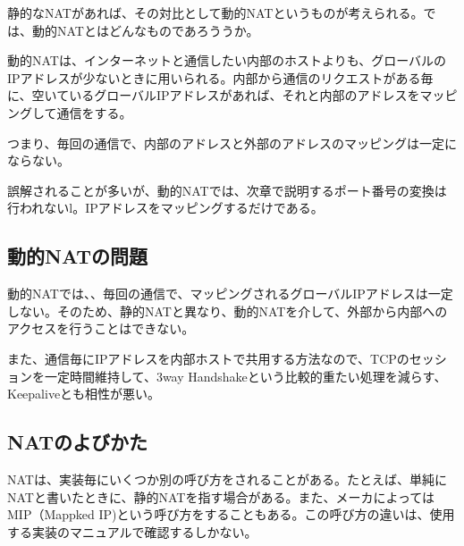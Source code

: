 静的なNATがあれば、その対比として動的NATというものが考えられる。では、動的NATとはどんなものであろううか。

動的NATは、インターネットと通信したい内部のホストよりも、グローバルのIPアドレスが少ないときに用いられる。内部から通信のリクエストがある毎に、空いているグローバルIPアドレスがあれば、それと内部のアドレスをマッピングして通信をする。

つまり、毎回の通信で、内部のアドレスと外部のアドレスのマッピングは一定にならない。

誤解されることが多いが、動的NATでは、次章で説明するポート番号の変換は行われないl。IPアドレスをマッピングするだけである。


\subsection{動的NATの問題}

動的NATでは、、毎回の通信で、マッピングされるグローバルIPアドレスは一定しない。そのため、静的NATと異なり、動的NATを介して、外部から内部へのアクセスを行うことはできない。

また、通信毎にIPアドレスを内部ホストで共用する方法なので、TCPのセッションを一定時間維持して、3way Handshakeという比較的重たい処理を減らす、Keepaliveとも相性が悪い。

\subsection{NATのよびかた}
NATは、実装毎にいくつか別の呼び方をされることがある。たとえば、単純にNATと書いたときに、静的NATを指す場合がある。また、メーカによってはMIP（Mappked IP)という呼び方をすることもある。この呼び方の違いは、使用する実装のマニュアルで確認するしかない。

